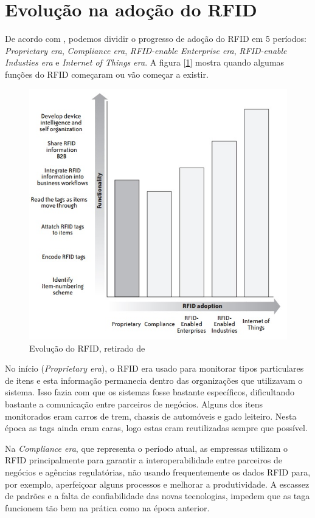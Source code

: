 \documentclass[a4paper,12pt,titlepage]{article}
\begin{document}
	\section{Evolução na adoção do RFID}
	De acordo com \cite{rfidbook}, podemos dividir o progresso de adoção do RFID em 5 períodos: \textit{Proprietary era}, \textit{Compliance era}, \textit{RFID-enable Enterprise era}, \textit{RFID-enable Industies era} e \textit{Internet of Things era}. A figura [\ref{fig:rfideras}] mostra quando algumas funções do RFID começaram ou vão começar a existir.
	
	\begin{figure}[h!]
		\centering
		\includegraphics[width=0.6\linewidth]{rfideras}
		\caption{Evolução do RFID, retirado de \cite{rfidbook}}
		\label{fig:rfideras}
	\end{figure}
	
	No início (\textit{Proprietary era}), o RFID era usado para monitorar tipos particulares de itens e esta informação permanecia dentro das organizações que utilizavam o sistema. Isso fazia com que os sistemas fosse bastante específicos, dificultando bastante a comunicação entre parceiros de negócios. Alguns dos itens monitorados eram carros de trem, chassis de automóveis e gado leiteiro. Nesta época as tags ainda eram caras, logo estas eram reutilizadas sempre que possível. 
	
	Na \textit{Compliance era}, que representa o período atual, as empressas utilizam o RFID principalmente para garantir a interoperabilidade entre parceiros de negócios e agências regulatórias, não usando frequentemente os dados RFID para, por exemplo, aperfeiçoar alguns processos e melhorar a produtividade. A escassez de padrões e a falta de confiabilidade das novas tecnologias, impedem que as taga funcionem tão bem na prática como na época anterior.
	
\end{document}

